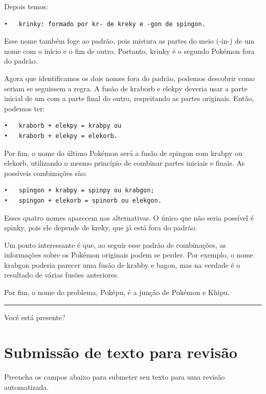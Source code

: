 \documentclass[
]{book}
\begin{document}
Depois temos:

\begin{verbatim}
•   krinky: formado por kr- de kreky e -gon de spingon.
\end{verbatim}

Esse nome também foge ao padrão, pois mistura as partes do meio (-in-) de um nome com o início e o fim de outro. Portanto, krinky é o segundo Pokémon fora do padrão.

Agora que identificamos os dois nomes fora do padrão, podemos descobrir como seriam se seguissem a regra. A fusão de kraborb e elekpy deveria usar a parte inicial de um com a parte final do outro, respeitando as partes originais. Então, podemos ter:

\begin{verbatim}
•   kraborb + elekpy = krabpy ou
•   kraborb + elekpy = elekorb.
\end{verbatim}

Por fim, o nome do último Pokémon será a fusão de spingon com krabpy ou elekorb, utilizando o mesmo princípio de combinar partes iniciais e finais. As possíveis combinações são:

\begin{verbatim}
•   spingon + krabpy = spinpy ou krabgon;
•   spingon + elekorb = spinorb ou elekgon.
\end{verbatim}

Esses quatro nomes aparecem nas alternativas. O único que não seria possível é spinky, pois ele depende de kreky, que já está fora do padrão.

Um ponto interessante é que, ao seguir esse padrão de combinações, as informações sobre os Pokémon originais podem se perder. Por exemplo, o nome krabgon poderia parecer uma fusão de krabby e bagon, mas na verdade é o resultado de várias fusões anteriores.

Por fim, o nome do problema, Poképu, é a junção de Pokémon e Khipu.

\begin{center}\rule{0.5\linewidth}{0.5pt}\end{center}

Você está presente?

\chapter{Submissão de texto para revisão}\label{submissuxe3o-de-texto-para-revisuxe3o}

Preencha os campos abaixo para submeter seu texto para uma revisão automatizada.
\end{document}
